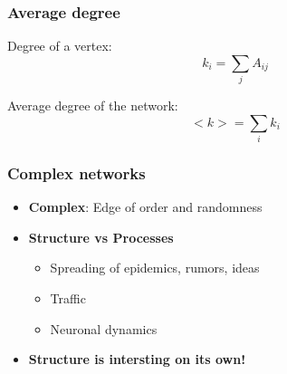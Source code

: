\documentclass{beamer}
\begin{document}
\begin{frame}
    \frametitle{Average degree}
    Degree of a vertex: 
    \begin{equation*}
    k_i = \sum\limits_{j}A_{ij} 
    \end{equation*}

    Average degree of the network: 
    $$<k> = \sum\limits_{i}k_i$$
\end{frame}
\begin{frame}
    \frametitle{Complex networks}
    \begin{itemize}
    \setlength\itemsep{2em}
       \item{\Large {\bf Complex}: Edge of order and randomness}
        \pause
        \item{\Large {\bf Structure vs Processes}
            \begin{itemize}
            \setlength\itemsep{1em}
                \item{Spreading of epidemics, rumors, ideas}
                \item{Traffic}
                \item{Neuronal dynamics}
            \end{itemize}
        }
        \pause
        \item{\Large \bf Structure is intersting on its own!}
    \end{itemize}
\end{frame}
\end{document}

